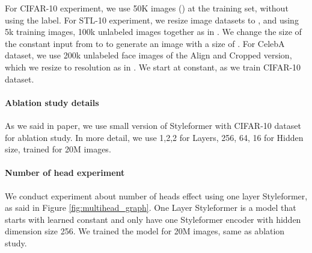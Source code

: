 \documentclass[10pt,twocolumn,letterpaper]{article}
\begin{document}
For CIFAR-10 experiment, we use 50K images () at the training set, without using the label. For STL-10 experiment, we resize  image datasets to , and using 5k training images, 100k unlabeled images together as in \cite{jiang2021transgan}. We change the size of the constant input from  to  to generate an image with a size of . For CelebA dataset, we use 200k unlabeled face images of the Align and Cropped version, which we resize to  resolution as in \cite{jiang2021transgan}. We start at  constant, as we train CIFAR-10 dataset. 



\begin{table}[!t]
\centering
\caption{Details of Styleformer hyperparameters at low resolution synthesis. This model setting match with performance result at Table 2 in paper.}

\label{table:size model}
\end{table}


\paragraph{Ablation study details}
As we said in paper, we use small version of Styleformer with CIFAR-10 dataset for ablation study. In more detail, we use {1,2,2} for Layers, {256, 64, 16} for Hidden size, trained for 20M images. 

\paragraph{Number of head experiment}
We conduct experiment about number of heads effect using one layer Styleformer, as said in Figure \ref{fig:multihead_graph}. One Layer Styleformer is a model that starts with  learned constant and only have one Styleformer encoder with hidden dimension size 256. We trained the model for 20M images, same as ablation study. 
\end{document}
